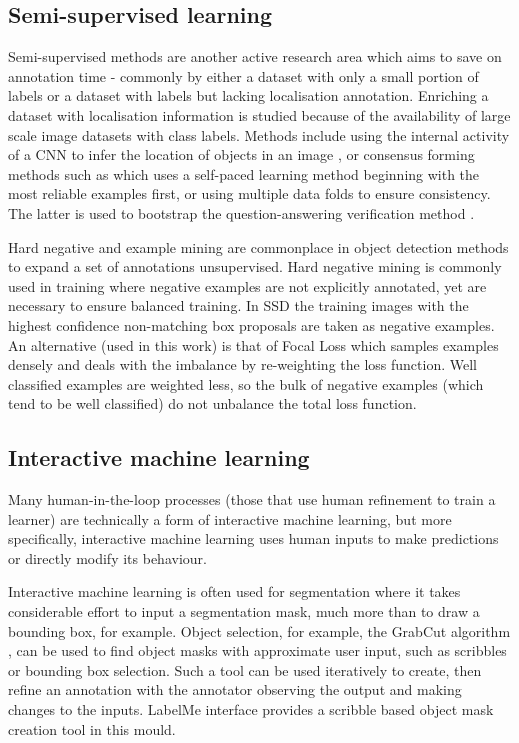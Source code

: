 \subsection{Semi-supervised learning}

Semi-supervised methods are another active research area which aims to save on annotation time - commonly by either a dataset with only a small portion of labels or a dataset with labels but lacking localisation annotation. Enriching a dataset with localisation information is studied because of the availability of large scale image datasets with class labels. Methods include using the internal activity of a \gls{CNN} to infer the location of objects in an image \cite{Sivic2015}, or consensus forming methods such as \cite{Sangineto} which uses a self-paced learning method beginning with the most reliable examples first, or \cite{Cinbis2017} using multiple data folds to ensure consistency. The latter is used to bootstrap the question-answering verification method \cite{Papadopoulos2016}.

Hard negative and example mining are commonplace in object detection methods to expand a set of annotations unsupervised. Hard negative mining is commonly used in training where negative examples are not explicitly annotated, yet are necessary to ensure balanced training. In \gls{SSD} \cite{Liu2016a} the training images with the highest confidence non-matching  box proposals are taken as negative examples. An alternative (used in this work) is that of Focal Loss \cite{Lin2017} which samples examples densely and deals with the imbalance by re-weighting the loss function. Well classified examples are weighted less, so the bulk of negative examples (which tend to be well classified) do not unbalance the total loss function.

\subsection{Interactive machine learning}

Many human-in-the-loop processes (those that use human refinement to train a learner) are technically a form of interactive machine learning, but more specifically, interactive machine learning uses human inputs to make predictions or directly modify its behaviour.

Interactive machine learning is often used for segmentation where it takes considerable effort to input a segmentation mask, much more than to draw a bounding box, for example. Object selection, for example, the GrabCut algorithm \cite{Rother}, can be used to find object masks with approximate user input, such as scribbles or bounding box selection. Such a tool can be used iteratively to create, then refine an annotation with the annotator observing the output and making changes to the inputs.  LabelMe \cite{Russell2007} interface provides a scribble based object mask creation tool in this mould. 


